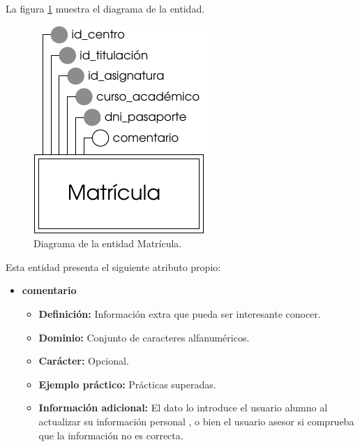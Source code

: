 \begin{description}
   \item[Diagrama] La figura \ref{diagramaMatricula} muestra el diagrama de la entidad.
   \item \begin{figure}[!ht]
            \begin{center}
            \includegraphics[]{07.Modelo_Entidad-Interrelacion/7.2.Analisis_Entidades/diagramas/matricula.pdf}
            \caption{Diagrama de la entidad Matrícula.}
            \label{diagramaMatricula}
            \end{center}
         \end{figure}

   \item[Descripción de los atributos propios] Esta entidad presenta el
   siguiente atributo propio:

   \begin{itemize}
    \item \textbf{comentario}
    \begin{itemize}
      \item \textbf{Definición:} Información extra que pueda ser
      interesante conocer.
      \item \textbf{Dominio:} Conjunto de caracteres alfanuméricos.
      \item \textbf{Carácter:} Opcional.
      \item \textbf{Ejemplo práctico:} Prácticas superadas.
      \item \textbf{Información adicional:} El dato lo introduce el
      usuario alumno al actualizar su información personal , o
      bien el usuario asesor si comprueba que la información no es
      correcta.
    \end{itemize}
   \end{itemize}


\end{description}
